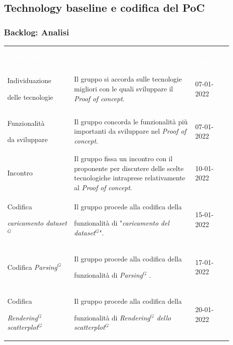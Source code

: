 \subsection{Technology baseline e codifica del PoC}
\subsubsection{Backlog: Analisi}
{\renewcommand{\arraystretch}{1.5}
\begin{longtable}{p{0.27\linewidth}p{0.49\linewidth}p{0.15\linewidth}}
	\rowcolor[RGB]{33, 73, 50}
	\textcolor{white}{\textbf{Titolo attività}} & \textcolor{white}{\textbf{Descrizione}} & \textcolor{white}{\textbf{Data inizio}}\\
    
    \rowcolor[RGB]{216, 235, 171}
    Individuazione \par delle tecnologie & Il gruppo si accorda sulle tecnologie migliori con le quali sviluppare il \textit{Proof of concept}. & 07-01-2022\\

    \rowcolor[RGB]{233, 245, 206}
    Funzionalità \par da sviluppare & Il gruppo concorda le funzionalità più importanti da sviluppare nel \textit{Proof of concept}. & 07-01-2022\\

    \rowcolor[RGB]{216, 235, 171}
    Incontro & Il gruppo fissa un incontro con il proponente per discutere delle scelte tecnologiche intraprese relativamente al \textit{Proof of concept}. & 10-01-2022\\

    \rowcolor[RGB]{233, 245, 206}
    Codifica \par \textit{caricamento dataset$^{G}$} & Il gruppo procede alla codifica della \par funzionalità di "\textit{caricamento del dataset$^{G}$}". & 15-01-2022\\

    \rowcolor[RGB]{216, 235, 171}
    Codifica \textit{Parsing}$^G$  & Il gruppo procede alla codifica della \par funzionalità di \textit{Parsing}$^G$ . & 17-01-2022\\

    \rowcolor[RGB]{233, 245, 206}
    Codifica \par \textit{Rendering$^G$ scatterplot$^{G}$} & Il gruppo procede alla codifica della \par funzionalità di \textit{Rendering$^G$  dello scatterplot$^G$ } & 20-01-2022\\


\end{longtable}}
